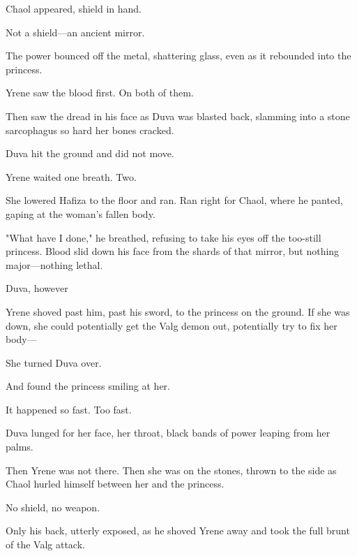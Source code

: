 Chaol appeared, shield in hand.

Not a shield---an ancient mirror.

The power bounced off the metal, shattering glass, even as it rebounded into the princess.

Yrene saw the blood first.
On both of them.

Then saw the dread in his face as Duva was blasted back, slamming into a stone sarcophagus so hard her bones cracked.

Duva hit the ground and did not move.

Yrene waited one breath.
Two.

She lowered Hafiza to the floor and ran.
Ran right for Chaol, where he panted, gaping at the woman's fallen body.

"What have I done," he breathed, refusing to take his eyes off the too-still princess.
Blood slid down his face from the shards of that mirror, but nothing major---nothing lethal.

Duva, however 

Yrene shoved past him, past his sword, to the princess on the ground.
If she was down, she could potentially get the Valg demon out, potentially try to fix her body---

She turned Duva over.

And found the princess smiling at her.

It happened so fast.
Too fast.

Duva lunged for her face, her throat, black bands of power leaping from her palms.

Then Yrene was not there.
Then she was on the stones, thrown to the side as Chaol hurled himself between her and the princess.

No shield, no weapon.

Only his back, utterly exposed, as he shoved Yrene away and took the full brunt of the Valg attack.

